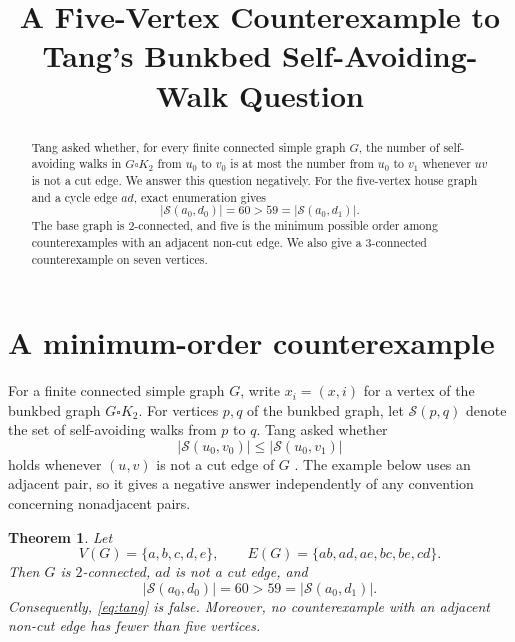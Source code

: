 \documentclass[11pt]{amsart}
\title[A five-vertex bunkbed counterexample]
{A Five-Vertex Counterexample to Tang's Bunkbed Self-Avoiding-Walk Question}
\date{}
\newtheorem{theorem}{Theorem}
\theoremstyle{remark}
\newcommand{\SAW}{\mathcal S}
\begin{document}
\begin{abstract}
Tang asked whether, for every finite connected simple graph $G$, the
number of self-avoiding walks in $G\square K_2$ from $u_0$ to $v_0$
is at most the number from $u_0$ to $v_1$ whenever $uv$ is not a cut
edge. We answer this question negatively. For the five-vertex house
graph and a cycle edge $ad$, exact enumeration gives
\[
  |\SAW(a_0,d_0)|=60>59=|\SAW(a_0,d_1)|.
\]
The base graph is $2$-connected, and five is the minimum possible
order among counterexamples with an adjacent non-cut edge. We also
give a $3$-connected counterexample on seven vertices.
\end{abstract}

\maketitle

\section{A minimum-order counterexample}

For a finite connected simple graph $G$, write $x_i=(x,i)$ for a
vertex of the bunkbed graph $G\square K_2$. For vertices $p,q$ of the
bunkbed graph, let $\SAW(p,q)$ denote the set of self-avoiding walks
from $p$ to $q$. Tang asked whether
\begin{equation}
  |\SAW(u_0,v_0)|\le |\SAW(u_0,v_1)|
  \label{eq:tang}
\end{equation}
holds whenever $(u,v)$ is not a cut edge of $G$
\cite[Question~3.3]{Tang}. The example below uses an adjacent pair,
so it gives a negative answer independently of any convention
concerning nonadjacent pairs.

\begin{theorem}
Let
\[
  V(G)=\{a,b,c,d,e\},\qquad
  E(G)=\{ab,ad,ae,bc,be,cd\}.
\]
Then $G$ is $2$-connected, $ad$ is not a cut edge, and
\[
  |\SAW(a_0,d_0)|=60>59=|\SAW(a_0,d_1)|.
\]
Consequently, \eqref{eq:tang} is false. Moreover, no counterexample
with an adjacent non-cut edge has fewer than five vertices.
\end{theorem}
\end{document}
